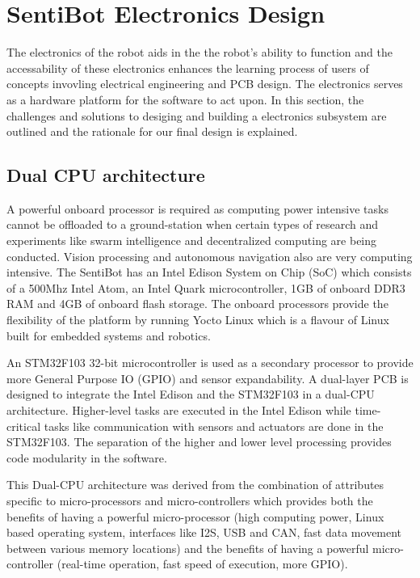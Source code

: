 \documentclass[12pt]{article}
\begin{document}
\section{SentiBot Electronics Design}

The electronics of the robot aids in the the robot's ability to function and the accessability of these electronics enhances the learning process of users of concepts invovling electrical engineering and PCB design. The electronics serves as a hardware platform for the software to act upon. In this section, the challenges and solutions to desiging and building a electronics subsystem are outlined and the rationale for our final design is explained.

\subsection{Dual CPU architecture}

A powerful onboard processor is required as computing power intensive tasks cannot be offloaded to a ground-station when certain types of research and experiments like swarm intelligence and decentralized computing\cite{swarm} are being conducted. Vision processing and autonomous navigation also are very computing intensive\cite{vision}. The SentiBot has an Intel Edison System on Chip (SoC) which consists of a 500Mhz Intel Atom, an Intel Quark microcontroller, 1GB of onboard DDR3 RAM and 4GB of onboard flash storage. The onboard processors provide the flexibility of the platform by running Yocto Linux which is a flavour of Linux built for embedded systems and robotics. 

An STM32F103 32-bit microcontroller is used as a secondary processor to provide more General Purpose IO (GPIO) and sensor expandability. A dual-layer PCB is designed to integrate the Intel Edison and the STM32F103 in a dual-CPU architecture. Higher-level tasks are executed in the Intel Edison while time-critical tasks like communication with sensors and actuators are done in the STM32F103. The separation of the higher and lower level processing provides code modularity in the software.

This Dual-CPU architecture was derived from the combination of attributes specific to micro-processors and micro-controllers which provides both the benefits of having a powerful micro-processor (high computing power, Linux based operating system, interfaces like I2S, USB and CAN, fast data movement between various memory locations) and the benefits of having a powerful micro-controller (real-time operation, fast speed of execution, more GPIO). 
\end{document}
